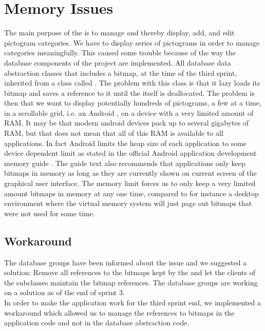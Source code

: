 
\section{Memory Issues}
\label{sec:memory_issues}

The main purpose of the \ct is to manage and thereby display, add, and edit pictogram categories. We have to display series of pictograms in order to manage categories meaningfully. This caused some trouble because of the way the database components of the project are implemented. All database data abstraction classes that includes a bitmap, at the time of the third sprint, inherited from a class called . The problem with this class is that it lazy loads its bitmap and saves a reference to it until the  itself is deallocated. The problem is then that we want to display potentially hundreds of pictograms, a few at a time, in a scrollable grid, i.e. an Android , on a device with a very limited amount of RAM. It may be that modern android devices pack up to several gigabytes of RAM, but that does not mean that all of this RAM is available to all applications. In fact Android limits the heap size of each application to some device dependent limit as stated in the official Android application development memory guide \parencite{android_memory}. The guide text also recommends that applications only keep bitmaps in memory as long as they are currently shown on current screen of the graphical user interface. The memory limit forces us to only keep a very limited amount bitmaps in memory at any one time, compared to for instance a desktop environment where the virtual memory system will just page out bitmaps that were not used for some time. 

\subsection{Workaround}

The database groups have been informed about the issue and we suggested a solution: Remove all references to the bitmaps kept by the  and let the clients of the  subclasses maintain the bitmap references. The database groups are working on a solution as of the end of sprint 3. \\

In order to make the \ct application work for the third sprint end, we implemented a workaround which allowed us to manage the references to bitmaps in the application code and not in the database abstraction code. \\

